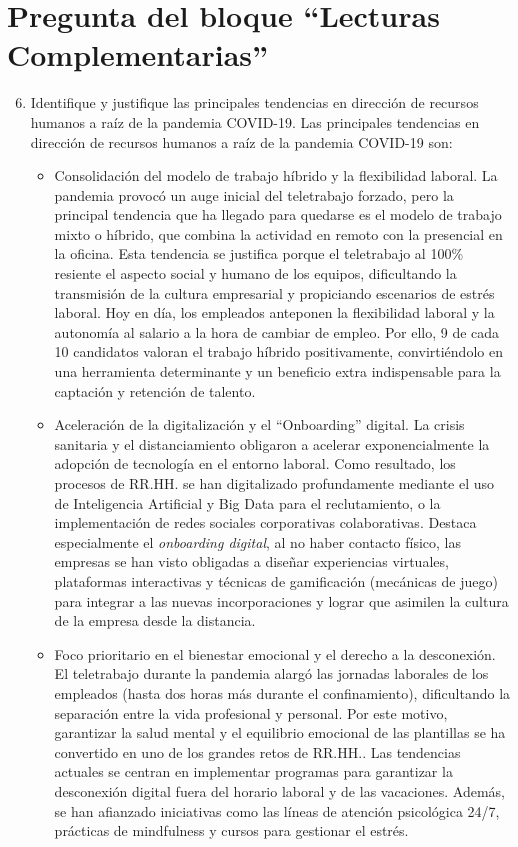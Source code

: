 \documentclass[12pt]{book} %
\begin{document}
\section*{Pregunta del bloque ``Lecturas Complementarias''}

\begin{enumerate}
    \setcounter{enumi}{5}
    \item Identifique y justifique las principales tendencias en dirección de recursos humanos a raíz de la pandemia COVID-19.
    Las principales tendencias en dirección de recursos humanos a raíz de la pandemia COVID-19 son:
    \begin{itemize}
        \item Consolidación del modelo de trabajo híbrido y la flexibilidad laboral. La pandemia provocó un auge inicial del teletrabajo forzado, pero la principal tendencia que ha llegado para quedarse es el modelo de trabajo mixto o híbrido, que combina la actividad en remoto con la presencial en la oficina. Esta tendencia se justifica porque el teletrabajo al 100\% resiente el aspecto social y humano de los equipos, dificultando la transmisión de la cultura empresarial y propiciando escenarios de estrés laboral. Hoy en día, los empleados anteponen la flexibilidad laboral y la autonomía al salario a la hora de cambiar de empleo. Por ello, 9 de cada 10 candidatos valoran el trabajo híbrido positivamente, convirtiéndolo en una herramienta determinante y un beneficio extra indispensable para la captación y retención de talento.
        
        \item Aceleración de la digitalización y el ``Onboarding'' digital. La crisis sanitaria y el distanciamiento obligaron a acelerar exponencialmente la adopción de tecnología en el entorno laboral. Como resultado, los procesos de RR.HH. se han digitalizado profundamente mediante el uso de Inteligencia Artificial y Big Data para el reclutamiento, o la implementación de redes sociales corporativas colaborativas. Destaca especialmente el \textit{onboarding digital}, al no haber contacto físico, las empresas se han visto obligadas a diseñar experiencias virtuales, plataformas interactivas y técnicas de gamificación (mecánicas de juego) para integrar a las nuevas incorporaciones y lograr que asimilen la cultura de la empresa desde la distancia.
        
        \item Foco prioritario en el bienestar emocional y el derecho a la desconexión. El teletrabajo durante la pandemia alargó las jornadas laborales de los empleados (hasta dos horas más durante el confinamiento), dificultando la separación entre la vida profesional y personal. Por este motivo, garantizar la salud mental y el equilibrio emocional de las plantillas se ha convertido en uno de los grandes retos de RR.HH.. Las tendencias actuales se centran en implementar programas para garantizar la desconexión digital fuera del horario laboral y de las vacaciones. Además, se han afianzado iniciativas como las líneas de atención psicológica 24/7, prácticas de mindfulness y cursos para gestionar el estrés.
        

\end{itemize}
\end{enumerate}
\end{document}
